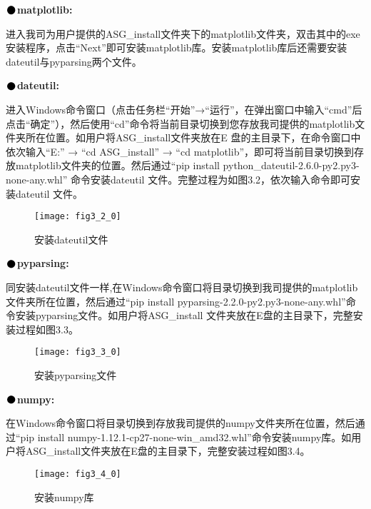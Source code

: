\noindent$\vcenter{\hbox{\huge$\bullet$}}$\quad\fontsize{12pt}{\baselineskip}\textbf{matplotlib:}

进入我司为用户提供的ASG\_install文件夹下的matplotlib文件夹，双击其中的exe安装程序，点击“Next”即可安装matplotlib库。安装matplotlib库后还需要安装dateutil与pyparsing两个文件。
\vspace{0.3cm}

\noindent$\vcenter{\hbox{\huge$\bullet$}}$\quad\fontsize{12pt}{\baselineskip}\textbf{dateutil:}

进入Windows命令窗口（点击任务栏“开始”→“运行”，在弹出窗口中输入“cmd”后点击“确定”），然后使用“cd”命令将当前目录切换到您存放我司提供的matplotlib文件夹所在位置。如用户将ASG\_install文件夹放在E 盘的主目录下，在命令窗口中依次输入“E:” → “cd ASG\_install” → “cd matplotlib”，即可将当前目录切换到存放matplotlib文件夹的位置。然后通过“pip install python\_dateutil-2.6.0-py2.py3-none-any.whl” 命令安装dateutil 文件。完整过程为如图3.2，依次输入命令即可安装dateutil 文件。
\begin{figure}[ht]
\centering
\texttt{[image: fig3\_2\_0]}
\caption{安装dateutil文件}
\end{figure}

\newpage
\noindent$\vcenter{\hbox{\huge$\bullet$}}$\quad\fontsize{12pt}{\baselineskip}\textbf{pyparsing:}

同安装dateutil文件一样,在Windows命令窗口将目录切换到我司提供的matplotlib文件夹所在位置，然后通过“pip install pyparsing-2.2.0-py2.py3-none-any.whl”命令安装pyparsing文件。如用户将ASG\_install 文件夹放在E盘的主目录下，完整安装过程如图3.3。


\begin{figure}[H]
\centering
\texttt{[image: fig3\_3\_0]}
\caption{安装pyparsing文件}
\end{figure}

\noindent$\vcenter{\hbox{\huge$\bullet$}}$\quad\fontsize{12pt}{\baselineskip}\textbf{numpy:}

在Windows命令窗口将目录切换到存放我司提供的numpy文件夹所在位置，然后通过“pip install numpy-1.12.1-cp27-none-win\_amd32.whl”命令安装numpy库。如用户将ASG\_install文件夹放在E盘的主目录下，完整安装过程如图3.4。
\begin{figure}[H]
\centering
\texttt{[image: fig3\_4\_0]}
\caption{安装numpy库}
\end{figure}

